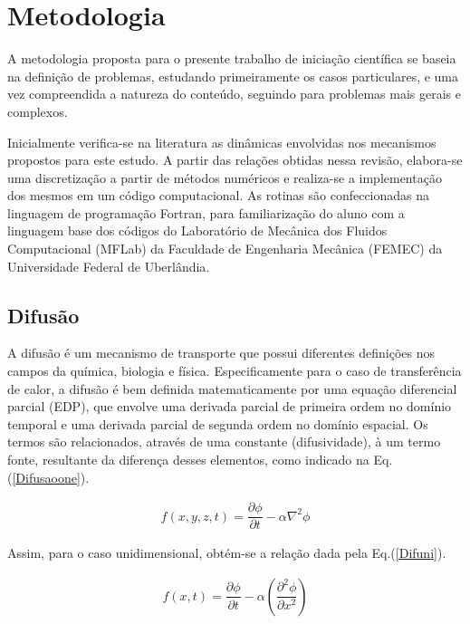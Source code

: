 	
\newpage
	

 \section{Metodologia}

\noindent

	A metodologia proposta para o presente trabalho de iniciação científica se baseia
na definição de problemas, estudando primeiramente os casos particulares, e uma vez
compreendida a natureza do conteúdo, seguindo para problemas mais gerais e complexos.

	Inicialmente verifica-se na literatura as dinâmicas envolvidas nos mecanismos propostos para este estudo. A partir das relações obtidas nessa revisão, elabora-se uma discretização a partir de métodos numéricos e realiza-se a implementação dos mesmos em um código computacional. As rotinas são confeccionadas na linguagem de programação Fortran, para familiarização do aluno com a linguagem base dos códigos do Laboratório de Mecânica dos Fluidos Computacional (MFLab) da Faculdade de Engenharia Mecânica (FEMEC) da Universidade Federal de Uberlândia.
 

\subsection{Difusão}

\noindent

	A difusão é um mecanismo de transporte que possui diferentes definições nos campos da química, biologia e física. Especificamente para o caso de transferência de calor, a difusão é bem definida matematicamente por uma equação diferencial parcial (EDP), que envolve uma derivada parcial de primeira ordem no domínio temporal e uma derivada parcial de segunda ordem no domínio espacial. Os termos são relacionados, através de uma constante (difusividade), à um termo fonte, resultante da diferença desses elementos, como indicado na Eq. (\ref{Difusaoone}).
	
\begin{align}
 \label{Difusaoone}
 f(x,y,z,t) = \dfrac{\partial \phi}{\partial t} - \alpha \nabla^2 \phi
\end{align}

	Assim, para o caso unidimensional, obtém-se a relação dada pela Eq.(\ref{Difuni}).
	
\begin{align}
 \label{Difuni}
 f(x,t) = \dfrac{\partial \phi}{\partial t} - \alpha \left(\dfrac{\partial^2 \phi}{\partial x^2}\right)
\end{align}

